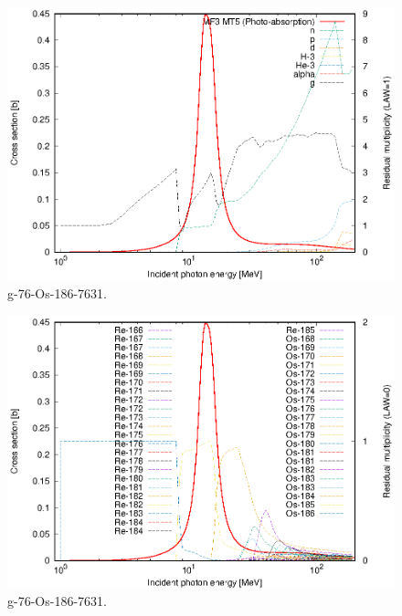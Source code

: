 \begin{figure}
 \includegraphics[width=\linewidth]{eps/g_76-Os-186_7631.eps}
  \caption{g-76-Os-186-7631.}
\end{figure}
\begin{figure}
 \includegraphics[width=\linewidth]{eps-law0/g_76-Os-186_7631.eps}
 \caption{g-76-Os-186-7631.}
\end{figure}
\newpage \clearpage

